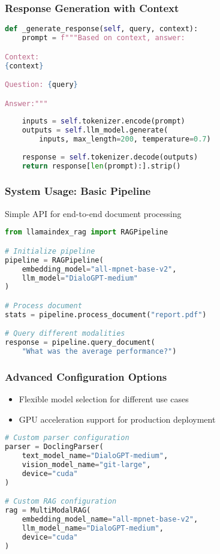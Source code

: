 \begin{frame}[fragile]\frametitle{Response Generation with Context}
\begin{lstlisting}[language=Python, basicstyle=\tiny]
def _generate_response(self, query, context):
    prompt = f"""Based on context, answer:

Context:
{context}

Question: {query}

Answer:"""
    
    inputs = self.tokenizer.encode(prompt)
    outputs = self.llm_model.generate(
        inputs, max_length=200, temperature=0.7)
    
    response = self.tokenizer.decode(outputs)
    return response[len(prompt):].strip()
\end{lstlisting}
\end{frame}

\begin{frame}[fragile]\frametitle{System Usage: Basic Pipeline}
Simple API for end-to-end document processing

\begin{lstlisting}[language=Python, basicstyle=\tiny]
from llamaindex_rag import RAGPipeline

# Initialize pipeline
pipeline = RAGPipeline(
    embedding_model="all-mpnet-base-v2",
    llm_model="DialoGPT-medium"
)

# Process document
stats = pipeline.process_document("report.pdf")

# Query different modalities
response = pipeline.query_document(
    "What was the average performance?")
\end{lstlisting}
\end{frame}

\begin{frame}[fragile]\frametitle{Advanced Configuration Options}

\begin{itemize}
\item Flexible model selection for different use cases
\item GPU acceleration support for production deployment
\end{itemize}

\begin{lstlisting}[language=Python, basicstyle=\tiny]
# Custom parser configuration
parser = DoclingParser(
    text_model_name="DialoGPT-medium",
    vision_model_name="git-large",
    device="cuda"
)

# Custom RAG configuration
rag = MultiModalRAG(
    embedding_model_name="all-mpnet-base-v2",
    llm_model_name="DialoGPT-medium",
    device="cuda"
)
\end{lstlisting}

\end{frame}

